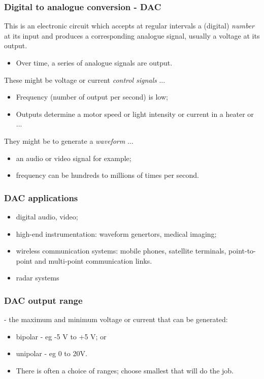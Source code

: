 \documentclass[10pt]{beamer}
\begin{document}
\begin{frame}
\frametitle{Digital to analogue conversion - DAC}
This is an electronic circuit which accepts at regular intervals a (digital) \emph{number} at its input and produces a corresponding analogue signal, usually a voltage at its output.
\begin{itemize}
\item Over time, a series of analogue signals are output.
\end{itemize}

These might be voltage or current \emph{control signals} ...
\begin{itemize}
\item Frequency (number of output per second) is low;
\item Outputs determine a motor speed or light intensity or current in a heater or ...
\end{itemize}

They might be to generate a \emph{waveform} ...
\begin{itemize}
\item an audio or video signal for example;
\item frequency can be hundreds to millions of times per second.
\end{itemize}
\end{frame}

\begin{frame}
\frametitle{DAC applications}
\begin{itemize}
\item digital audio, video;
\item high-end instrumentation: waveform genertors, medical imaging;
\item wireless communication systems: mobile phones, satellite terminals, point-to-point and multi-point communication links. 
\item radar systems
\end{itemize}
\end{frame}

\begin{frame}
\frametitle{DAC output range}
 - the maximum and minimum voltage or current that can be generated: 
\begin{itemize}
\item bipolar - eg -5 V to +5 V; or
\item unipolar - eg 0 to 20V.
\item There is often a choice of ranges; choose smallest that will do the job.
\end{itemize}
\end{frame}
\end{document}
